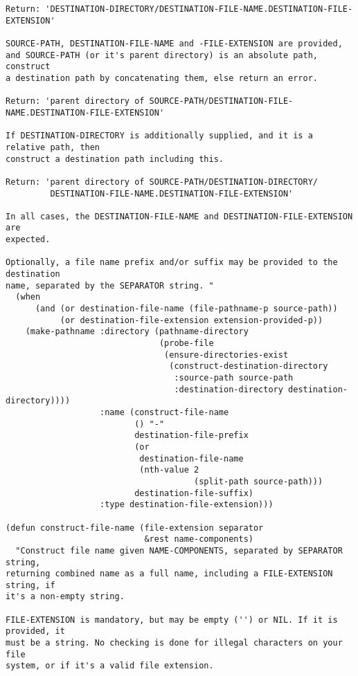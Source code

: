 \documentclass{article}
\begin{document}
\begin{verbatim}
Return: 'DESTINATION-DIRECTORY/DESTINATION-FILE-NAME.DESTINATION-FILE-EXTENSION'

SOURCE-PATH, DESTINATION-FILE-NAME and -FILE-EXTENSION are provided,
and SOURCE-PATH (or it's parent directory) is an absolute path, construct
a destination path by concatenating them, else return an error.

Return: 'parent directory of SOURCE-PATH/DESTINATION-FILE-NAME.DESTINATION-FILE-EXTENSION'

If DESTINATION-DIRECTORY is additionally supplied, and it is a relative path, then
construct a destination path including this.

Return: 'parent directory of SOURCE-PATH/DESTINATION-DIRECTORY/
         DESTINATION-FILE-NAME.DESTINATION-FILE-EXTENSION'

In all cases, the DESTINATION-FILE-NAME and DESTINATION-FILE-EXTENSION are
expected.

Optionally, a file name prefix and/or suffix may be provided to the destination
name, separated by the SEPARATOR string. "
  (when
      (and (or destination-file-name (file-pathname-p source-path))
           (or destination-file-extension extension-provided-p))
    (make-pathname :directory (pathname-directory
                               (probe-file
                                (ensure-directories-exist 
                                 (construct-destination-directory
                                  :source-path source-path
                                  :destination-directory destination-directory))))
                   :name (construct-file-name 
                          () "-"
                          destination-file-prefix
                          (or 
                           destination-file-name
                           (nth-value 2
                                      (split-path source-path)))
                          destination-file-suffix)
                   :type destination-file-extension)))

(defun construct-file-name (file-extension separator
                            &rest name-components)
  "Construct file name given NAME-COMPONENTS, separated by SEPARATOR string,
returning combined name as a full name, including a FILE-EXTENSION string, if
it's a non-empty string.

FILE-EXTENSION is mandatory, but may be empty ('') or NIL. If it is provided, it
must be a string. No checking is done for illegal characters on your file
system, or if it's a valid file extension.


\end{verbatim}
\end{document}
